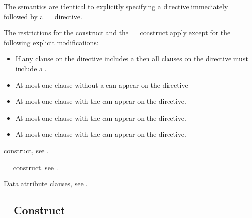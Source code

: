 \descr
The semantics are identical to explicitly specifying a  directive
immediately followed by a ~~ directive.

\restrictions
The restrictions for the  construct and the
~~ construct apply except for the
following explicit modifications:

\begin{itemize}
\item If any  clause on the directive includes a
       then all  clauses
      on the directive must include a .
\item At most one  clause without a
       can appear on the directive.
\item At most one  clause with the 
       can appear on the directive.
\item At most one  clause with the 
       can appear on the directive.
\item At most one  clause with the 
       can appear on the directive.
\end{itemize}

\begin{crossrefs}
\item {} construct, see
.

\item {}~~ construct, see
.

\item Data attribute clauses, see
.
\end{crossrefs}



\subsection{~ Construct}
\label{subsec:teams distribute Construct}


